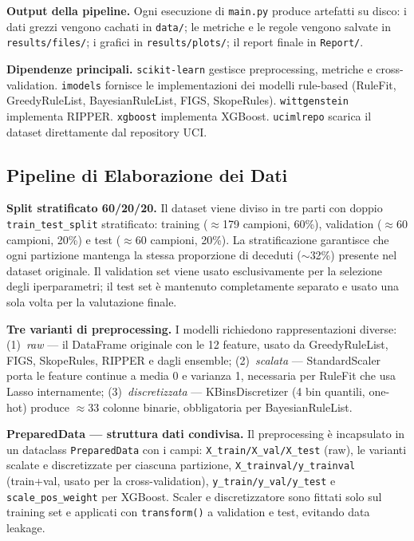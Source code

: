 \documentclass[a4paper,11pt]{article}
\begin{document}
\medskip
\textbf{Output della pipeline.}
Ogni esecuzione di \texttt{main.py} produce artefatti su disco: i dati grezzi vengono cachati
in \texttt{data/}; le metriche e le regole vengono salvate in \texttt{results/files/}; i
grafici in \texttt{results/plots/}; il report finale in \texttt{Report/}.

\textbf{Dipendenze principali.}
\texttt{scikit-learn} gestisce preprocessing, metriche e cross-validation.
\texttt{imodels} fornisce le implementazioni dei modelli rule-based (RuleFit, GreedyRuleList,
BayesianRuleList, FIGS, SkopeRules). \texttt{wittgenstein} implementa RIPPER.
\texttt{xgboost} implementa XGBoost. \texttt{ucimlrepo} scarica il dataset direttamente dal
repository UCI.

\subsection{Pipeline di Elaborazione dei Dati}

\textbf{Split stratificato 60/20/20.}
Il dataset viene diviso in tre parti con doppio \texttt{train\_test\_split} stratificato:
training ($\approx$179 campioni, 60\%), validation ($\approx$60 campioni, 20\%) e test
($\approx$60 campioni, 20\%).
La stratificazione garantisce che ogni partizione mantenga la stessa proporzione di deceduti
($\sim$32\%) presente nel dataset originale.
Il validation set viene usato esclusivamente per la selezione degli iperparametri;
il test set è mantenuto completamente separato e usato una sola volta per la valutazione finale.

\textbf{Tre varianti di preprocessing.}
I modelli richiedono rappresentazioni diverse: (1)~\emph{raw} --- il DataFrame originale con le
12 feature, usato da GreedyRuleList, FIGS, SkopeRules, RIPPER e dagli ensemble;
(2)~\emph{scalata} --- StandardScaler porta le feature continue a media 0 e varianza 1,
necessaria per RuleFit che usa Lasso internamente;
(3)~\emph{discretizzata} --- KBinsDiscretizer (4 bin quantili, one-hot) produce $\approx$33
colonne binarie, obbligatoria per BayesianRuleList.

\textbf{PreparedData --- struttura dati condivisa.}
Il preprocessing è incapsulato in un dataclass \texttt{PreparedData} con i campi:
\texttt{X\_train/X\_val/X\_test} (raw), le varianti scalate e discretizzate per ciascuna
partizione, \texttt{X\_trainval/y\_trainval} (train+val, usato per la cross-validation),
\texttt{y\_train/y\_val/y\_test} e \texttt{scale\_pos\_weight} per XGBoost.
Scaler e discretizzatore sono fittati solo sul training set e applicati con
\texttt{transform()} a validation e test, evitando data leakage.
\end{document}
